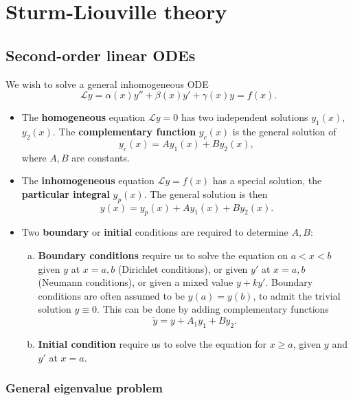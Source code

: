\documentclass[12pt]{article}
\theoremstyle{definition}
\theoremstyle{remark}
\begin{document}
\newpage

\section{Sturm-Liouville theory}%
\label{sec:sturm_liouville_theory}

\subsection{Second-order linear ODEs}%
\label{sub:second_order_linear_odes}

We wish to solve a general inhomogeneous ODE
\[
	\mathcal{L}y = \alpha(x) y'' + \beta(x) y' + \gamma(x) y = f(x)
.\]
\begin{itemize}
	\item The \textbf{homogeneous} equation $\mathcal{L} y = 0$ has two independent solutions $y_1(x)$, $y_2(x)$. The \textbf{complementary function} $y_c(x)$ is the general solution of
		\[
			y_c(x) = A y_1(x) +B y_2(x)
		,\]
		where $A, B$ are constants.
	\item The \textbf{inhomogeneous} equation $\mathcal{L}y = f(x)$ has a special solution, the \textbf{particular integral} $y_p(x)$. The general solution is then
		\[
			y(x) = y_p(x) + Ay_1(x) + By_2(x)
		.\]
	\item Two \textbf{boundary} or \textbf{initial} conditions are required to determine $A, B$:
		\begin{enumerate}[(a)]
			\item \textbf{Boundary conditions} require us to solve the equation on $a < x < b$ given $y$ at $x = a, b$ (Dirichlet conditions), or given $y'$ at $x = a, b$ (Neumann conditions), or given a mixed value $y + ky'$. Boundary conditions are often assumed to be $y(a) = y(b)$, to admit the trivial solution $y \equiv 0$. This can be done by adding complementary functions
				\[
				\tilde y = y + A_1 y_1 + B y_2
				.\]
			\item \textbf{Initial condition} require us to solve the equation for $x \geq a$, given $y$ and $y'$ at $x = a$.
		\end{enumerate}
		
\end{itemize}

\subsubsection{General eigenvalue problem}%
\label{subsub:general_eigenvalue_problem}
\end{document}
